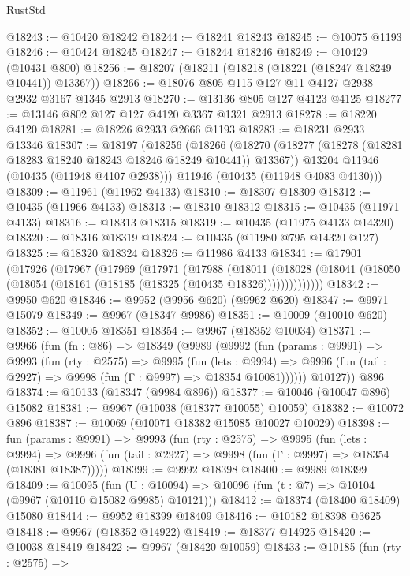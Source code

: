 \begin{lexlean}{RustStd}
\begin{coremodule}
{\begin{coremodule}
{{{{{{{{{{{{{{{{{{{{{{{{{{{{{{{{{{{{{{{{{{{{{{{{{{{{{{{{{{{{{{{{{{{{{{{{{{{{{{@18243 := @10420 @18242
@18244 := @18241 @18243
@18245 := @10075 @1193
@18246 := @10424 @18245
@18247 := @18244 @18246
@18249 := @10429 (@10431 @800)
@18256 := @18207 (@18211 (@18218 (@18221 (@18247 @18249 @10441)) @13367))
@18266 := @18076 @805 @115 @127 @11 @4127 @2938 @2932 @3167 @1345 @2913
@18270 := @13136 @805 @127 @4123 @4125
@18277 := @13146 @802 @127 @127 @4120 @3367 @1321 @2913
@18278 := @18220 @4120
@18281 := @18226 @2933 @2666 @1193
@18283 := @18231 @2933 @13346
@18307 := @18197
    (@18256
      (@18266
        (@18270 (@18277 (@18278 (@18281 @18283 @18240 @18243 @18246 @18249 @10441)) @13367))
        @13204
        @11946
        (@10435 (@11948 @4107 @2938)))
      @11946
      (@10435 (@11948 @4083 @4130)))
@18309 := @11961 (@11962 @4133)
@18310 := @18307 @18309
@18312 := @10435 (@11966 @4133)
@18313 := @18310 @18312
@18315 := @10435 (@11971 @4133)
@18316 := @18313 @18315
@18319 := @10435 (@11975 @4133 @14320)
@18320 := @18316 @18319
@18324 := @10435 (@11980 @795 @14320 @127)
@18325 := @18320 @18324
@18326 := @11986 @4133
@18341 := @17901
    (@17926
      (@17967
        (@17969
          (@17971
            (@17988
              (@18011
                (@18028 (@18041 (@18050 (@18054 (@18161 (@18185 (@18325 (@10435 @18326))))))))))))))
@18342 := @9950 @620
@18346 := @9952 (@9956 @620) (@9962 @620)
@18347 := @9971 @15079
@18349 := @9967 (@18347 @9986)
@18351 := @10009 (@10010 @620)
@18352 := @10005 @18351
@18354 := @9967 (@18352 @10034)
@18371 := @9966
    (fun (fn : @86) =>
    @18349
      (@9989
        (@9992
          (fun (params : @9991) =>
          @9993
            (fun (rty : @2575) =>
            @9995
              (fun (lets : @9994) =>
              @9996 (fun (tail : @2927) => @9998 (fun (Γ : @9997) => @18354 @10081))))))
        @10127))
    @896
@18374 := @10133 (@18347 (@9984 @896))
@18377 := @10046 (@10047 @896) @15082
@18381 := @9967 (@10038 (@18377 @10055) @10059)
@18382 := @10072 @896
@18387 := @10069 (@10071 @18382 @15085 @10027 @10029)
@18398 := fun (params : @9991) =>
  @9993
    (fun (rty : @2575) =>
    @9995
      (fun (lets : @9994) =>
      @9996 (fun (tail : @2927) => @9998 (fun (Γ : @9997) => @18354 (@18381 @18387)))))
@18399 := @9992 @18398
@18400 := @9989 @18399
@18409 := @10095
    (fun (U : @10094) => @10096 (fun (t : @7) => @10104 (@9967 (@10110 @15082 @9985) @10121)))
@18412 := @18374 (@18400 @18409) @15080
@18414 := @9952 @18399 @18409
@18416 := @10182 @18398 @3625
@18418 := @9967 (@18352 @14922)
@18419 := @18377 @14925
@18420 := @10038 @18419
@18422 := @9967 (@18420 @10059)
@18433 := @10185
    (fun (rty : @2575) =>
}}}}}}}}}}}}}}}}}}}}}}}}}}}}}}}}}}}}}}}}}}}}}}}}}}}}}}}}}}}}}}}}}}}}}}}}}}}}}}
\end{coremodule}}
\end{coremodule}
\end{lexlean}
